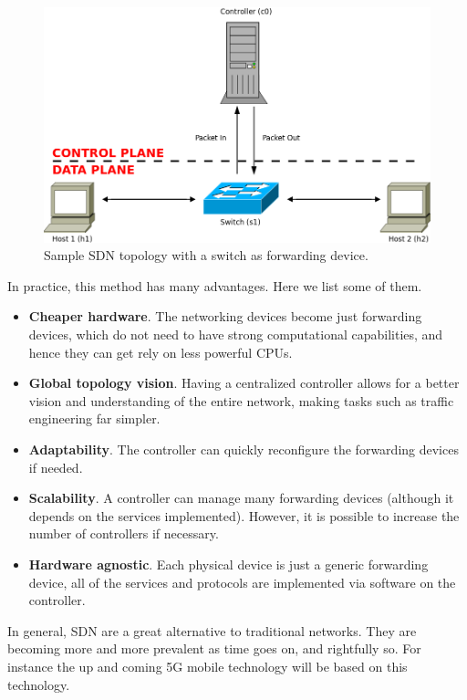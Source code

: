 \begin{figure}
  \includegraphics[width=\linewidth]{imagenes/Technologies/SDN.png}
  \caption{Sample SDN topology with a switch as forwarding device.}
  \label{fig:SDN_example}
\end{figure}

In practice, this method has many advantages. Here we list some of them.
\begin{itemize}
    \item \textbf{Cheaper hardware}. The networking devices become just forwarding devices, which do not need to have strong computational capabilities, and hence they can get rely on less powerful CPUs.
    \item \textbf{Global topology vision}. Having a centralized controller allows for a better vision and understanding of the entire network, making tasks such as traffic engineering far simpler.
    \item \textbf{Adaptability}. The controller can quickly reconfigure the forwarding devices if needed.
    \item \textbf{Scalability}. A controller can manage many forwarding devices (although it depends on the services implemented). However, it is possible to increase the number of controllers if necessary. 
    \item \textbf{Hardware agnostic}. Each physical device is just a generic forwarding device, all of the services and protocols are implemented via software on the controller.
\end{itemize}

In general, SDN are a great alternative to traditional networks. They are becoming more and more prevalent as time goes on, and rightfully so. For instance the up and coming 5G mobile technology will be based on this technology.

